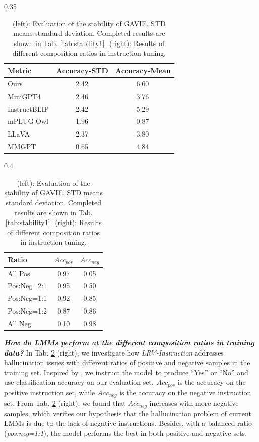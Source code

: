 \begin{table}[t]
\begin{subtable}[t]{0.35\textwidth}
\small
\begin{tabular}{lcc}
\toprule[1.5pt]
Metric& Accuracy-STD & Accuracy-Mean\\
\midrule
Ours& 2.42 & 6.60\\
MiniGPT4& 2.46 & 3.76\\
InstructBLIP& 2.42 & 5.29\\
mPLUG-Owl& 1.96 & 0.87\\
LLaVA& 2.37 & 3.80\\
MMGPT& 0.65 & 4.84\\
\bottomrule[1.5pt]
\end{tabular}
\end{subtable}
\hspace{1.1in}
\begin{subtable}[t]{0.4\textwidth}
\setlength\tabcolsep{4.7pt}
\centering
\small
\begin{tabular}{lcc}
\toprule[1.5pt]
Ratio & $Acc_{pos}$  & $Acc_{neg}$ \\
\midrule
All Pos & 0.97 & 0.05\\
Pos:Neg=2:1 & 0.95 & 0.50\\
Pos:Neg=1:1 & 0.92 & 0.85\\
Pos:Neg=1:2 & 0.87 & 0.86\\
All Neg & 0.10 & 0.98\\
\bottomrule[1.5pt]
\end{tabular}
\end{subtable}
\vspace{-2mm}
\caption{(left): Evaluation of the stability of GAVIE. STD means standard deviation. Completed results are shown in Tab. \ref{tab:stability1}. (right): Results of different composition ratios in instruction tuning.}
\label{tab:experiments}
\vspace{-0.2in}
\end{table}

\textbf{\textit{How do LMMs perform at the different composition ratios in training data?}} In Tab. \ref{tab:experiments} (right), we investigate how \textit{LRV-Instruction} addresses hallucination issues with different ratios of positive and negative samples in the training set. Inspired by \citep{li2023evaluating}, we instruct the model to produce “Yes” or “No” and use classification accuracy on our evaluation set. \textit{$Acc_{pos}$} is the accuracy on the positive instruction set, while \textit{$Acc_{neg}$} is the accuracy on the negative instruction set. From Tab. \ref{tab:experiments} (right), we found that \textit{$Acc_{neg}$} increases with more negative samples, which verifies our hypothesis that the hallucination problem of current LMMs is due to the lack of negative instructions. Besides, with a balanced ratio (\textit{pos:neg=1:1}), the model performs the best in both positive and negative sets.

